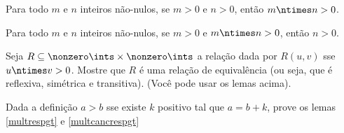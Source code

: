 \begin{definition}
	\label{multrespgt}
	Para todo $m$ e $n$ inteiros não-nulos, se $m > 0$ e $n > 0$, então $m \ntimes n > 0$.
\end{definition}

\begin{definition}
	\label{multcancrespgt}
	Para todo $m$ e $n$ inteiros não-nulos, se $m > 0$ e $m \ntimes n > 0$, então $n > 0$.
\end{definition}

\begin{exercise}
Seja $R \subseteq \nonzero\ints \times \nonzero\ints$ a relação dada por $R(u, v)$ sse $u \ntimes v > 0$.
Mostre que $R$ é uma relação de equivalência (ou seja, que é reflexiva, simétrica e transitiva).
(Você pode usar os lemas acima).
\end{exercise}

\begin{homework}
Dada a definição $a > b$ sse existe $k$ positivo tal que $a = b + k$, prove os lemas \ref{multrespgt} e \ref{multcancrespgt}
\end{homework}